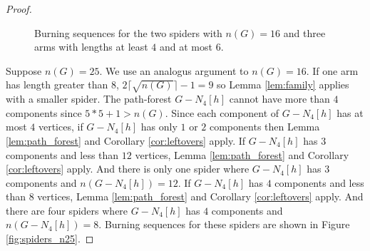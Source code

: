 \documentclass[12pt]{article}
\begin{document}
\begin{proof}
\begin{figure}
\begin{tiny}
        \end{tiny}
        \caption{
            Burning sequences for the two spiders with $n(G) = 16$ and three arms with lengths at least $4$ and at most $6$.
        }
        \label{fig:spiders_n16}
    \end{figure}

    Suppose $n(G) = 25$.
    We use an analogus argument to $n(G) = 16$.
    If one arm has length greater than $8$, $2 \lceil \sqrt{n(G)} \rceil - 1 = 9$ so Lemma \ref{lem:family} applies with a smaller spider.
    The path-forest $G - N_4[h]$ cannot have more than $4$ components since $5*5 + 1 > n(G)$.
    Since each component of $G-N_4[h]$ has at most $4$ vertices, if $G-N_4[h]$ has only $1$ or $2$ components then Lemma \ref{lem:path_forest} and Corollary \ref{cor:leftovers} apply.
    If $G-N_4[h]$ has $3$ components and less than $12$ vertices, Lemma \ref{lem:path_forest} and Corollary \ref{cor:leftovers} apply.
    And there is only one spider where $G-N_4[h]$ has $3$ components and $n(G-N_4[h]) = 12$.
    If $G-N_4[h]$ has $4$ components and less than $8$ vertices, Lemma \ref{lem:path_forest} and Corollary \ref{cor:leftovers} apply.
    And there are four spiders where $G-N_4[h]$ has $4$ components and $n(G-N_4[h]) = 8$.
    Burning sequences for these spiders are shown in Figure \ref{fig:spiders_n25}.
    

\end{proof}
\end{document}
